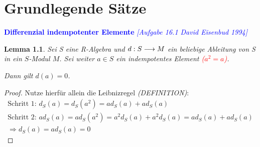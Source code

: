 \documentclass[10pt,a4paper]{report}
\newcommand{\comment}[1]{}
\newcommand{\ModulsOfDifferenzials}{David Eisenbud 1994}
\newcounter{Aussage}[chapter]
\newtheorem{lemma}[Aussage]{Lemma}
\newcommand{\functionfront}[3]{\nolinebreak{#1:#2 \longrightarrow #3}}
\newcommand{\divf}[1]{d_{#1}}
\begin{document}
\chapter{Grundlegende Sätze}

\textcolor{blue}{\textbf{Differenzial indempotenter Elemente} \textit{[Aufgabe 16.1 \ModulsOfDifferenzials]}}
\begin{lemma}\label{Differenzial indempotenter Elemente}
Sei S eine R-Algebra und $\functionfront{d}{S}{M}$ ein beliebige Ableitung von S in ein $S$-Modul $M$. Sei weiter $a \in S$ ein indempotentes Element \textcolor{red}{($a^2 = a$)}.\\
\begin{center}
Dann gilt $d(a) = 0$. 
\end{center}
\end{lemma}
\begin{proof}
Nutze hierfür allein die Leibnizregel \textit{(DEFINITION)}: \comment{\label{*Definition Leibnizregel}}  
\begin{gather*}
\text{Schritt 1: } \divf{S}(a) = \divf{S}(a^2) = a\divf{S}(a) + a\divf{S}(a) \\
\text{Schritt 2: } a\divf{S}(a) = a\divf{S}(a^2) = a^2\divf{S}(a) + a^2\divf{S}(a) = a\divf{S}(a) + a\divf{S}(a)\\
\Rightarrow \divf{S}(a) = a\divf{S}(a) = 0
\end{gather*}
\end{proof}
\end{document}
